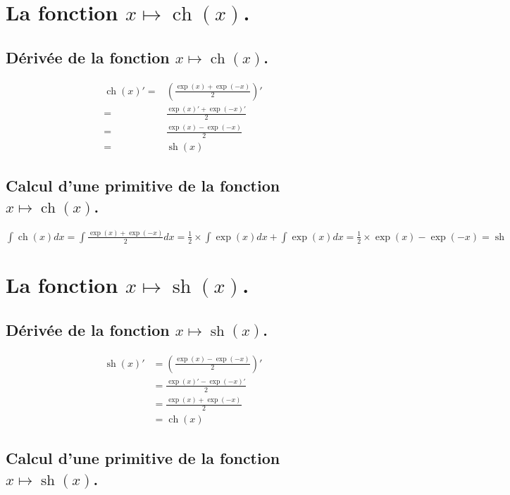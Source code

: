 \documentclass[a4paper,12pt]{report}
\renewcommand{\sinh}{\mathop{\mathrm{sh}}}
\renewcommand{\cosh}{\mathop{\mathrm{ch}}}
\begin{document}
\section{La fonction  $x \mapsto \cosh(x)$.}

\subsection{Dérivée de la fonction $x \mapsto \cosh(x)$.}
\begin{align*}
\cosh(x)' =& \left( \frac{\exp(x)+\exp(-x)}{2} \right)' \\ =& \frac{\exp(x)'+\exp(-x)'}{2} \\=& \frac{\exp(x)-\exp(-x)}{2} \\=& \sinh(x)
\end{align*}




\subsection{Calcul d'une primitive de la fonction  $x \mapsto \cosh(x)$.}

$\int \cosh(x) dx = \int \frac{\exp(x)+ \exp(-x)}{2} dx = \frac{1}{2} \times \int \exp(x) dx + \int \exp(x) dx = \frac{1}{2} \times \exp(x) - \exp(-x) = \sinh$
\\


\section{La fonction  $x \mapsto \sinh(x)$.}


\subsection{Dérivée de la fonction $x \mapsto \sinh(x)$.}

\begin{align*}
\sinh(x)' & = \left( \frac{\exp(x)-\exp(-x)}{2} \right)' \\ 
& = \frac{\exp(x)'-\exp(-x)'}{2} \\
& = \frac{\exp(x)+\exp(-x)}{2} \\
& = \cosh(x)
\end{align*}





\subsection{Calcul d'une primitive de la fonction  $x \mapsto \sinh(x)$.}
\end{document}
